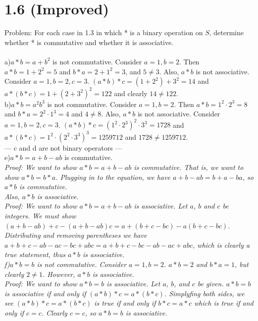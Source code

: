 \documentclass{scrartcl}
\begin{document}
\section{1.6 (Improved)}
Problem: For each case in 1.3 in which * is a binary operation on $S$, determine whether * is commutative and whether it is associative.\\\\
a)$a*b=a+b^2$ is not commutative. Consider $a=1, b=2$. Then $a*b=1+2^2=5$ and $b*a=2+1^2=3$, and $5\ne3$. Also, $a*b$ is not associative. Consider $a=1, b=2, c=3$. $(a*b)*c=(1+2^2)+3^2=14$ and $a*(b*c)=1+(2+3^2)^2=122$ and clearly $14\ne122$.\\

b)$a*b=a^2b^3$ is not commutative. Consider $a=1, b=2$. Then $a*b=1^2\cdot2^3=8$ and $b*a=2^2\cdot1^3=4$ and $4\ne8$. Also, $a*b$ is not associative. Consider $a=1, b=2, c=3$. $(a*b)*c=(1^2\cdot2^3)^2\cdot3^3=1728$ and $a*(b*c)=1^2\cdot(2^2\cdot3^3)^3=1259712$ and $1728\ne1259712$.\\

--- c and d are not binary operators ---\\

e)$a*b=a+b-ab$ is commutative.\\

\em Proof: \em We want to show $a*b=a+b-ab$ is commutative. That is, we want to show $a*b=b*a$. Plugging in to the equation, we have $a+b-ab=b+a-ba$, so $a*b$ is commutative.\\

Also, $a*b$ is associative.\\

\em Proof: \em We want to show $a*b=a+b-ab$ is associative. Let $a$, $b$ and $c$ be integers. We must show $(a+b-ab)+c-(a+b-ab)c=a+(b+c-bc)-a(b+c-bc)$. Distributing and removing parentheses we have $a+b+c-ab-ac-bc+abc=a+b+c-bc-ab-ac+abc$, which is clearly a true statement, thus $a*b$ is associative.\\

f)$a*b=b$ is not commutative. Consider $a=1,b=2$. $a*b=2$ and $b*a=1$, but clearly $2\ne1$. However, $a*b$ is associative.\\

\em Proof: \em We want to show $a*b=b$ is associative. Let $a$, $b$, and $c$ be given. $a*b=b$ is associative if and only if $(a*b)*c=a*(b*c)$. Simplyfing both sides, we see $(a*b)*c=a*(b*c)$ is true if and only if $b*c=a*c$ which is true if and only if $c=c$. Clearly $c=c$, so $a*b=b$ is associative.\\
\end{document}
